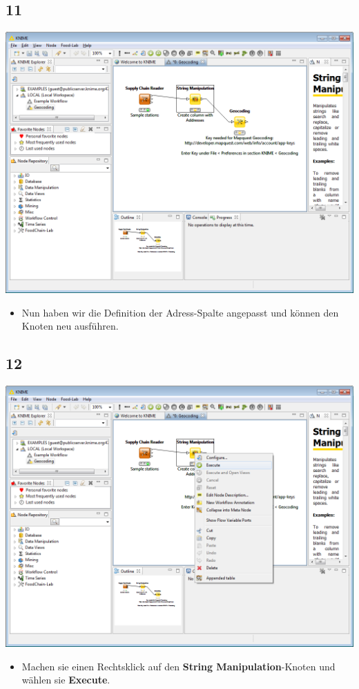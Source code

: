 \documentclass{beamer}
\begin{document}
\subsection{11}
\begin{frame}
	\begin{center}
  		\includegraphics[height=0.6\textheight]{11.png}
	\end{center}
	\begin{itemize}
		\item Nun haben wir die Definition der Adress-Spalte angepasst und können den Knoten neu ausführen.
	\end{itemize}
\end{frame}

\subsection{12}
\begin{frame}
	\begin{center}
  		\includegraphics[height=0.6\textheight]{12.png}
	\end{center}
	\begin{itemize}
		\item Machen sie einen Rechtsklick auf den \textbf{String Manipulation}-Knoten und wählen sie \textbf{Execute}.
	\end{itemize}
\end{frame}
\end{document}
